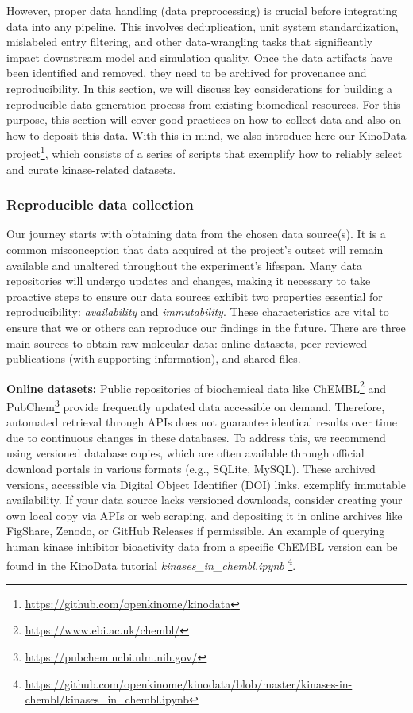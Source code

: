 \documentclass[9pt,lessons]{livecoms}
\begin{document}
However, proper data handling (data preprocessing) is crucial before integrating data into any pipeline. 
This involves deduplication, unit system standardization, mislabeled entry filtering, and other data-wrangling tasks that significantly impact downstream model and simulation quality. 
Once the data artifacts have been identified and removed, they need to be archived for provenance and reproducibility. 
In this section, we will discuss key considerations for building a reproducible data generation process from existing biomedical resources. For this purpose, this section will cover good practices on how to collect data and also on how to deposit this data. With this in mind, we also introduce here our KinoData project\footnote{\href{https://github.com/openkinome/kinodata}{https://github.com/openkinome/kinodata}}, which consists of a series of scripts that exemplify how to reliably select and curate kinase-related datasets.


\subsubsection{Reproducible data collection}

Our journey starts with obtaining data from the chosen data source(s).
It is a common misconception that data acquired at the project's outset will remain available and unaltered throughout the experiment's lifespan. 
Many data repositories will undergo updates and changes, making it necessary to take proactive steps to ensure our data sources exhibit two properties essential for reproducibility: \textit{availability} and \textit{immutability}.
These characteristics are vital to ensure that we or others can reproduce our findings in the future. 
There are three main sources to obtain raw molecular data: online datasets, peer-reviewed publications (with supporting information), and shared files. 


\textbf{Online datasets:} 
Public repositories of biochemical data like ChEMBL\footnote{\href{https://www.ebi.ac.uk/chembl/}{https://www.ebi.ac.uk/chembl/}} and PubChem\footnote{\href{https://pubchem.ncbi.nlm.nih.gov/}{https://pubchem.ncbi.nlm.nih.gov/}} provide frequently updated data accessible on demand. 
Therefore, automated retrieval through APIs does not guarantee identical results over time due to continuous changes in these databases. 
To address this, we recommend using versioned database copies, which are often available through official download portals in various formats (e.g., SQLite, MySQL). 
These archived versions, accessible via Digital Object Identifier (DOI) links, exemplify immutable availability. 
If your data source lacks versioned downloads, consider creating your own local copy via APIs or web scraping, and depositing it in online archives like FigShare, Zenodo, or GitHub Releases if permissible. An example of querying human kinase inhibitor bioactivity data from a specific ChEMBL version can be found in the KinoData tutorial \textit{kinases\_in\_chembl.ipynb} \footnote{\href{https://github.com/openkinome/kinodata/blob/master/kinases-in-chembl/kinases_in_chembl.ipynb}{https://github.com/openkinome/kinodata/blob/master/kinases-in-chembl/kinases\_in\_chembl.ipynb}}. 
\end{document}
